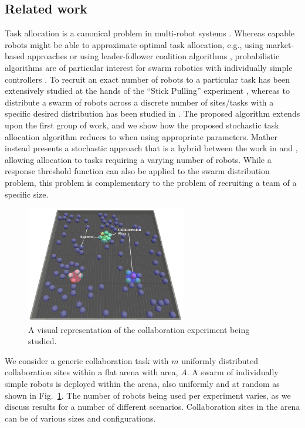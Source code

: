\documentclass[Main.tex]{subfiles}
\begin{document}
\subsection*{Related work}
Task allocation is a canonical problem in multi-robot systems \cite{Gerkey2004}. Whereas capable robots might be able to approximate optimal task allocation, e.g., using market-based approaches \cite{amstutz2008distributed,vig2007coalition} or using  leader-follower coalition algorithms \cite{Chen2011}, probabilistic algorithms are of particular interest for swarm robotics with individually simple controllers \cite{dantu2012comparison}. To recruit an exact number of robots to a particular task has been extensively studied at the hands of the ``Stick Pulling'' experiment \cite{Lerman2001,Martinoli2004}, whereas to distribute a swarm of robots across a discrete number of sites/tasks with a specific desired distribution has been studied in \cite{Berman2009,Correll2008}. The proposed algorithm extends upon the first group of work, and we show how the proposed stochastic task allocation algorithm reduces to \cite{Lerman2001,Martinoli2004} when using appropriate parameters.  Mather \cite{mather2010towards} instead presents a stochastic approach that is a hybrid between the work in \cite{Berman2009} and \cite{Martinoli2004}, allowing allocation to tasks requiring a varying number of robots.
While a response threshold function can also be applied to the swarm distribution problem, this problem is complementary to the problem of recruiting a team of a specific size. 



\begin{figure}[!htb]
\centering\includegraphics[width=7cm]{assets/setup.png}
\caption{A visual representation of the collaboration experiment being studied.}\label{fig:setup}
\end{figure}
We consider a generic collaboration task with $m$ uniformly distributed collaboration sites within a flat arena with area, $A$. A swarm of individually simple robots is deployed within the arena, also uniformly and at random as shown in Fig.~\ref{fig:setup}. The number of robots being used per experiment varies, as we discuss results for a number of different scenarios. Collaboration sites in the arena can be of various sizes and configurations.
\end{document}

